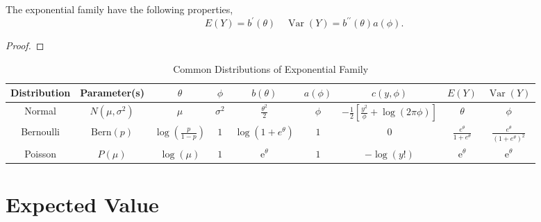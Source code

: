 \begin{property}
	The exponential family have the following properties,
	\begin{equation*}
		E(Y)=b^{\prime}(\theta)\quad\operatorname{Var}(Y)=b^{\prime\prime}(\theta)a(\phi).
	\end{equation*}
\end{property}

\begin{proof}

\end{proof}

\begin{landscape}
	\begin{table}[hpt]
		\centering
		\caption{Common Distributions of Exponential Family}
		\begin{tabular}{ccccccccc}
			\toprule
			Distribution & Parameter(s)      & $\theta$                         & $\phi$       & $b(\theta)$                     & $a(\phi)$ & $c(y,\phi)$                                                   & $E(Y)$                            & $\operatorname{Var}(Y)$                            \\
			\midrule
			Normal       & $N(\mu,\sigma^2)$ & $\mu$                            & $\sigma^{2}$ & $\frac{\theta^{2}}{2}$          & $\phi$    & $-\frac{1}{2}\left[\frac{y^{2}}{\phi}+\log (2\pi\phi)\right]$ & $\theta$                          & $\phi$                                             \\
			Bernoulli    & $\text{Bern}(p)$  & $\log\left(\frac{p}{1-p}\right)$ & $1$          & $\log\left(1+e^{\theta}\right)$ & $1$       & $0$                                                           & $\frac{e^{\theta}}{1+e^{\theta}}$ & $\frac{e^{\theta}}{\left(1+e^{\theta}\right)^{2}}$ \\
			Poisson      & $P(\mu)$          & $\log(\mu)$                      & $1$          & $\mathrm{e}^{\theta}$           & $1$       & $-\log(y!)$                                                   & $\mathrm{e}^{\theta}$             & $\mathrm{e}^{\theta}$                              \\
			\bottomrule
		\end{tabular}
	\end{table}
\end{landscape}

\section{Expected Value}

